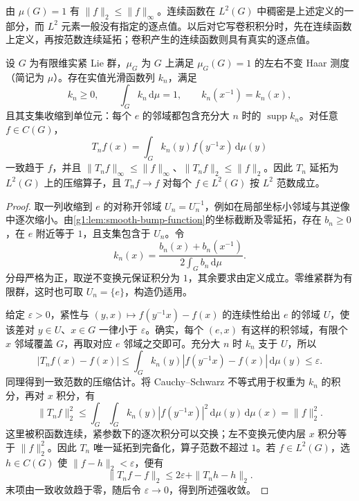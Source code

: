 \ProseParagraphBreak

由 \(\mu(G)=1\) 有 \(\|f\|_2\le\|f\|_\infty\)。连续函数在 \(L^2(G)\) 中稠密是上述定义的一部分，而 \(L^2\) 元素一般没有指定的逐点值。以后对它写卷积积分时，先在连续函数上定义，再按范数连续延拓；卷积产生的连续函数则具有真实的逐点值。

\begin{lemma}\label{g1:lem:compact-group-approximate-identity}
	设 \(G\) 为有限维实紧 Lie 群，\(\mu_G\) 为 \(G\) 上满足 \(\mu_G(G)=1\) 的左右不变 Haar 测度（简记为 \(\mu\)）。存在实值光滑函数列 \(k_n\)，满足
	\[
		k_n\ge0,\qquad \int_Gk_n\,\mathrm{d}\mu=1,
		\qquad k_n(x^{-1})=k_n(x),
	\]
	且其支集收缩到单位元：每个 \(e\) 的邻域都包含充分大 \(n\) 时的 \(\operatorname{supp}k_n\)。对任意 \(f\in C(G)\)，
	\[
		T_nf(x)=\int_G k_n(y)f(y^{-1}x)\,\mathrm{d}\mu(y)
	\]
	一致趋于 \(f\)，并且 \(\|T_nf\|_\infty\le\|f\|_\infty\)、\(\|T_nf\|_2\le\|f\|_2\)。因此 \(T_n\) 延拓为 \(L^2(G)\) 上的压缩算子，且 \(T_nf\to f\) 对每个 \(f\in L^2(G)\) 按 \(L^2\) 范数成立。
\end{lemma}
\begin{proof}
	取一列收缩到 \(e\) 的对称开邻域 \(U_n=U_n^{-1}\)，例如在局部坐标小邻域与其逆像中逐次缩小。由\cref{g1:lem:smooth-bump-function}的坐标截断及零延拓，存在 \(b_n\ge0\)，在 \(e\) 附近等于 \(1\)，且支集包含于 \(U_n\)。令
	\[
		k_n(x)=\frac{b_n(x)+b_n(x^{-1})}{2\int_Gb_n\,\mathrm{d}\mu}.
	\]
	分母严格为正，取逆不变换元保证积分为 \(1\)，其余要求由定义成立。零维紧群为有限群，这时也可取 \(U_n=\{e\}\)，构造仍适用。

	给定 \(\varepsilon>0\)，紧性与 \((y,x)\mapsto f(y^{-1}x)-f(x)\) 的连续性给出 \(e\) 的邻域 \(U\)，使该差对 \(y\in U\)、\(x\in G\) 一律小于 \(\varepsilon\)。确实，每个 \((e,x)\) 有这样的积邻域，有限个 \(x\) 邻域覆盖 \(G\)，再取对应 \(e\) 邻域之交即可。充分大 \(n\) 时 \(k_n\) 支于 \(U\)，所以
	\[
		|T_nf(x)-f(x)|
		\le\int_G k_n(y)|f(y^{-1}x)-f(x)|\,\mathrm{d}\mu(y)
		\le\varepsilon.
	\]
	同理得到一致范数的压缩估计。将 Cauchy--Schwarz 不等式用于权重为 \(k_n\) 的积分，再对 \(x\) 积分，有
	\[
		\|T_nf\|_2^2
		\le\int_G\int_G k_n(y)|f(y^{-1}x)|^2\,
		\mathrm{d}\mu(y)\,\mathrm{d}\mu(x)=\|f\|_2^2.
	\]
	这里被积函数连续，紧参数下的逐次积分可以交换；左不变换元使内层 \(x\) 积分等于 \(\|f\|_2^2\)。因此 \(T_n\) 唯一延拓到完备化，算子范数不超过 \(1\)。若 \(f\in L^2(G)\)，选 \(h\in C(G)\) 使 \(\|f-h\|_2<\varepsilon\)，便有
	\[
		\|T_nf-f\|_2\le2\varepsilon+\|T_nh-h\|_2.
	\]
	末项由一致收敛趋于零，随后令 \(\varepsilon\to0\)，得到所述强收敛。
\end{proof}


